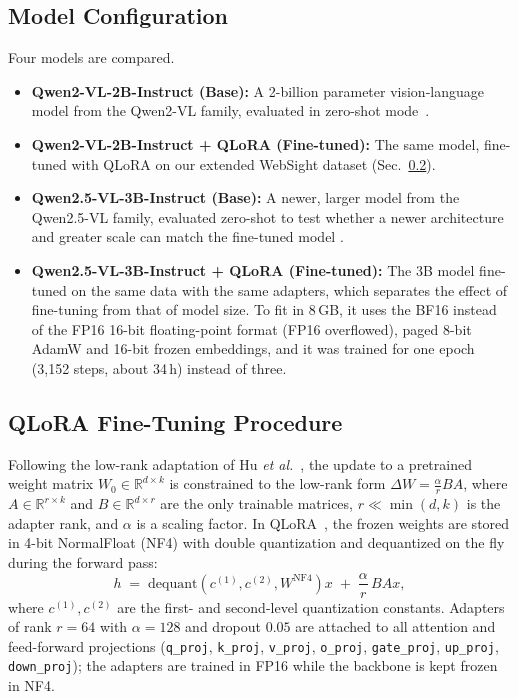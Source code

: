 \documentclass[conference,a4paper]{IEEEtran}
\begin{document}
\subsection{Model Configuration}

Four models are compared.

\begin{itemize}
    \item \textbf{Qwen2-VL-2B-Instruct (Base):} A 2-billion parameter vision-language model from the Qwen2-VL family, evaluated in zero-shot mode~\cite{qwen2vl}.
    
    \item \textbf{Qwen2-VL-2B-Instruct + QLoRA (Fine-tuned):} The same model, fine-tuned with QLoRA on our extended WebSight dataset (Sec.~\ref{subsec:qlora}).

    \item \textbf{Qwen2.5-VL-3B-Instruct (Base):} A newer, larger model from the Qwen2.5-VL family, evaluated zero-shot to test whether a newer architecture and greater scale can match the fine-tuned model \cite{qwen25vl}.

    \item \textbf{Qwen2.5-VL-3B-Instruct + QLoRA (Fine-tuned):} The 3B model fine-tuned on the same data with the same adapters, which separates the effect of fine-tuning from that of model size. To fit in 8\,GB, it uses the BF16 instead of the FP16 16-bit floating-point format (FP16 overflowed), paged 8-bit AdamW and 16-bit frozen embeddings, and it was trained for one epoch (3,152 steps, about 34\,h) instead of three.
\end{itemize}

\subsection{QLoRA Fine-Tuning Procedure}
\label{subsec:qlora}

Following the low-rank adaptation of Hu \textit{et al.}~\cite{hu2021lora},
the update to a pretrained weight matrix $W_0 \in \mathbb{R}^{d \times k}$ is
constrained to the low-rank form $\Delta W = \frac{\alpha}{r} B A$,
where $A \in \mathbb{R}^{r \times k}$ and $B \in \mathbb{R}^{d \times r}$ are
the only trainable matrices, $r \ll \min(d,k)$ is the adapter rank, and
$\alpha$ is a scaling factor. In QLoRA~\cite{dettmers2023qlora}, the frozen
weights are stored in 4-bit NormalFloat (NF4) with double quantization and
dequantized on the fly during the forward pass:
\begin{equation}
h \;=\; \mathrm{dequant}\!\left(c^{(1)}, c^{(2)}, W^{\mathrm{NF4}}\right) x
\;+\; \frac{\alpha}{r}\, B A x ,
\label{eq:qlora}
\end{equation}
where $c^{(1)}, c^{(2)}$ are the first- and second-level quantization
constants. Adapters of rank $r{=}64$ with $\alpha{=}128$ and dropout $0.05$
are attached to all attention and feed-forward projections (\texttt{q\_proj},
\texttt{k\_proj}, \texttt{v\_proj}, \texttt{o\_proj}, \texttt{gate\_proj},
\texttt{up\_proj}, \texttt{down\_proj}); the adapters are trained in FP16 while
the backbone is kept frozen in NF4.
\end{document}

